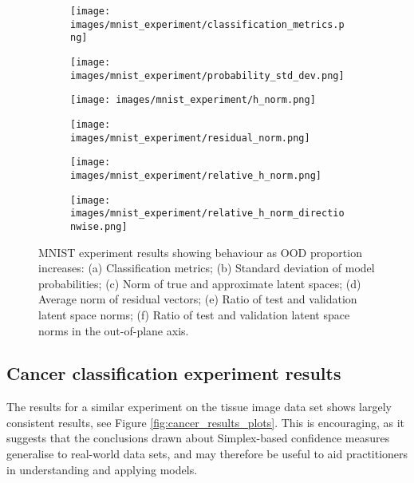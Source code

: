 \documentclass{article}
\begin{document}
\begin{figure}[ht]

\begin{subfigure}{.33\linewidth}
  \texttt{[image: images/mnist\_experiment/classification\_metrics.png]}
  \caption{}
  \label{res:mnist accuracy}
\end{subfigure}\hfill %
\begin{subfigure}{.33\linewidth}
  \texttt{[image: images/mnist\_experiment/probability\_std\_dev.png]}
  \caption{}
  \label{res:mnist prob std}
\end{subfigure}\hfill %
\begin{subfigure}{.33\linewidth}
  \texttt{[image: images/mnist\_experiment/h\_norm.png]}
  \caption{}
  \label{res:mnist h norm}
\end{subfigure}


\begin{subfigure}{.33\linewidth}
  \texttt{[image: images/mnist\_experiment/residual\_norm.png]}
  \caption{}
  \label{res:mnist r norm}
\end{subfigure}\hfill %
\begin{subfigure}{.33\linewidth}
  \texttt{[image: images/mnist\_experiment/relative\_h\_norm.png]}
  \caption{}
  \label{res:mnist relative h norm}
\end{subfigure}\hfill %
\begin{subfigure}{.33\linewidth}
  \texttt{[image: images/mnist\_experiment/relative\_h\_norm\_directionwise.png]}
  \caption{}
  \label{res:mnist relative h norm directionwise}
\end{subfigure}

\caption{
MNIST experiment results showing behaviour as OOD proportion increases:
(a) Classification metrics; (b) Standard deviation of model probabilities; (c) Norm of true and approximate latent spaces;
(d) Average norm of residual vectors; (e) Ratio of test and validation latent space norms; (f) Ratio of test and validation latent space norms in the out-of-plane axis.
}
\label{fig:mnist_results_ plots}
\end{figure}



\subsection{Cancer classification experiment results}
\label{sec:cancer results}
The results for a similar experiment on the tissue image data set shows largely consistent results, see Figure \ref{fig:cancer_results_plots}. This is encouraging, as it suggests that the conclusions drawn about Simplex-based confidence measures generalise to real-world data sets, and may therefore be useful to aid practitioners in understanding and applying models.
\end{document}
